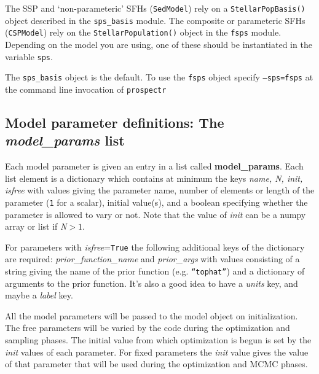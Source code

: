 The SSP and `non-parameteric' SFHs (\texttt{SedModel}) rely on a
\texttt{StellarPopBasis()} object described in the \texttt{sps_basis}
module.  The composite or parameteric SFHs (\texttt{CSPModel}) rely on
the \texttt{StellarPopulation()} object in the \texttt{fsps} module.
Depending on the model you are using, one of these should be
instantiated in the variable \texttt{sps}.

The \texttt{sps_basis} object is the default.  To use the
\texttt{fsps} object specify \texttt{--sps=fsps} at the command line
invocation of \texttt{prospectr}

\subsection{Model parameter definitions: The \emph{model_params} list}
Each model parameter is given an entry in a list called {\bf
model_params}. Each list element is a dictionary which contains at
minimum the keys {\it name, N, init, isfree} with values giving the
parameter name, number of elements or length of the parameter
(\texttt{1} for a scalar), initial value(s), and a boolean specifying
whether the parameter is allowed to vary or not.  Note that the value
of {\it init} can be a numpy array or list if {\it N}$>1$.

For parameters with {\it isfree}=\texttt{True} the following
additional keys of the dictionary are required: {\it
prior_function_name} and {\it prior_args} with values consisting of a
string giving the name of the prior function
(e.g. \texttt{``tophat''}) and a dictionary of arguments to the prior
function. It's also a good idea to have a {\it units} key, and maybe a
{\it label} key.

All the model parameters will be passed to the model object on
initialization.  The free parameters will be varied by the code during
the optimization and sampling phases.  The initial value from which
optimization is begun is set by the {\it init} values of each
parameter.  For fixed parameters the {\it init} value gives the value
of that parameter that will be used during the optimization and MCMC
phases.

